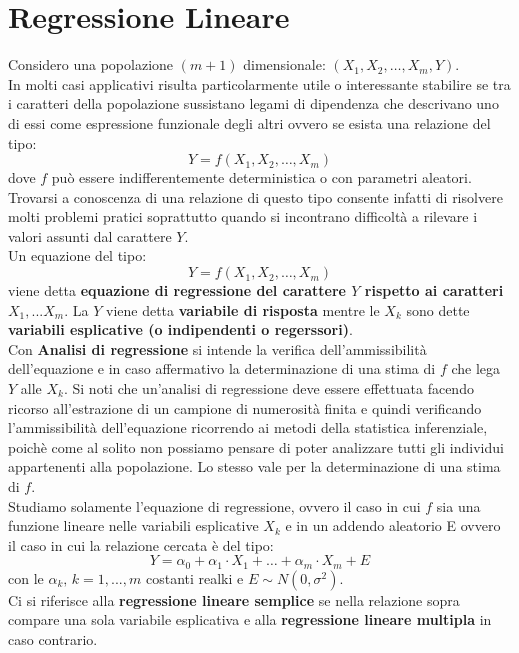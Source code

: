 \documentclass[a4paper,12pt, oneside]{book}
\begin{document}
\chapter{Regressione Lineare}
Considero una popolazione $(m+1)$ dimensionale: $\left(X_{1}, X_{2}, \ldots, X_{m}, Y\right)$.\\
In molti casi applicativi risulta particolarmente utile o interessante stabilire se tra i
caratteri della popolazione sussistano legami di dipendenza che descrivano uno di
essi come espressione funzionale degli altri ovvero se esista una relazione del tipo:
\[Y=f\left(X_{1}, X_{2}, \ldots, X_{m}\right)\]
dove $f$ può essere indifferentemente deterministica o con parametri aleatori.\\
Trovarsi a conoscenza di una relazione di questo tipo consente infatti di risolvere
molti problemi pratici soprattutto quando si incontrano difficoltà a rilevare i valori
assunti dal carattere $Y$.\\
Un equazione del tipo:
\[Y=f\left(X_{1}, X_{2}, \ldots, X_{m}\right)\]
viene detta \textbf{equazione di regressione del carattere $Y$ rispetto ai caratteri $X_1,...X_m$}. La $Y$ viene detta \textbf{variabile di risposta} mentre le $X_k$ sono dette \textbf{variabili esplicative (o indipendenti o regerssori)}.\\
Con \textbf{Analisi di regressione} si intende la verifica dell'ammissibilità dell'equazione e in caso affermativo la determinazione di una stima di $f$ che lega $Y$ alle $X_k$. Si noti che un'analisi di regressione deve essere effettuata facendo ricorso
all'estrazione di un campione di numerosità finita e quindi verificando l'ammissibilità dell'equazione ricorrendo ai metodi della statistica inferenziale, poichè come al solito non possiamo
pensare di poter analizzare tutti gli individui appartenenti alla popolazione. Lo stesso
vale per la determinazione di una stima di $f$.\\
Studiamo solamente l'equazione di regressione, ovvero il caso in cui $f$ sia una funzione lineare nelle variabili esplicative $X_k$ e in un
addendo aleatorio E ovvero il caso in cui la relazione cercata è del tipo:
\[Y=\alpha_{0}+\alpha_{1} \cdot X_{1}+\ldots+\alpha_{m} \cdot X_{m}+E\]
con le $\alpha_k,\, k=1,...,m$ costanti realki e $E\sim N(0,\sigma^2)$.\\
Ci si riferisce alla \textbf{regressione lineare semplice} se nella relazione sopra compare una sola variabile
esplicativa e alla \textbf{regressione lineare multipla} in caso contrario.\\
\end{document}
